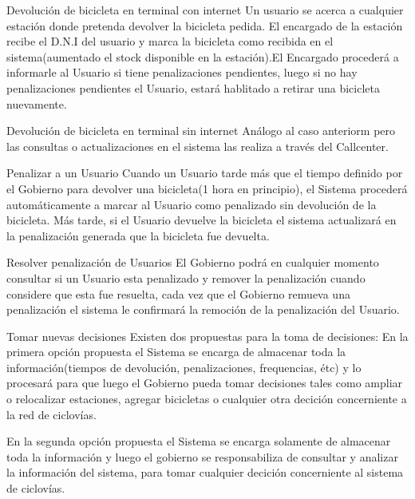 \begin{subsection}{Devolución de bicicleta en terminal con internet}
Un usuario se acerca a cualquier estación donde pretenda devolver la bicicleta pedida. El encargado de la estación
recibe el D.N.I del usuario y marca la bicicleta como recibida en el sistema(aumentado el stock disponible en la estación).El Encargado procederá a informarle al Usuario si tiene penalizaciones pendientes, luego si no hay penalizaciones pendientes el Usuario, estará hablitado a retirar una bicicleta nuevamente.
\end{subsection}

\begin{subsection}{Devolución de bicicleta en terminal sin internet}
Análogo al caso anteriorm pero las consultas o actualizaciones en el sistema las realiza a través del Callcenter.
\end{subsection}

\begin{subsection}{Penalizar a un Usuario}
Cuando un Usuario tarde más que el tiempo definido por el Gobierno para devolver una bicicleta(1 hora en principio), el Sistema procederá automáticamente a marcar al Usuario como penalizado sin devolución de la bicicleta. Más tarde, si el Usuario devuelve la bicicleta el sistema actualizará en la penalización generada que la bicicleta fue devuelta.
\end{subsection}

\begin{subsection}{Resolver penalización de Usuarios}
El Gobierno podrá en cualquier momento consultar si un Usuario esta penalizado y remover la penalización cuando considere que esta fue resuelta, cada vez que el Gobierno remueva una penalización el sistema le confirmará la remoción de la penalización del Usuario.
\end{subsection}

\begin{subsection}{Tomar nuevas decisiones}
Existen dos propuestas para la toma de decisiones:
En la primera opción propuesta el Sistema se encarga de almacenar toda la información(tiempos de devolución, penalizaciones, frequencias, étc) y lo procesará para que luego el Gobierno pueda tomar decisiones tales como ampliar o relocalizar estaciones, agregar bicicletas o cualquier otra decición concerniente a la red de ciclovías.

En la segunda opción propuesta el Sistema se encarga solamente de almacenar toda la información y luego el gobierno se responsabiliza de consultar y analizar la información del sistema, para tomar cualquier decición concerniente al sistema de ciclovías.
\end{subsection}